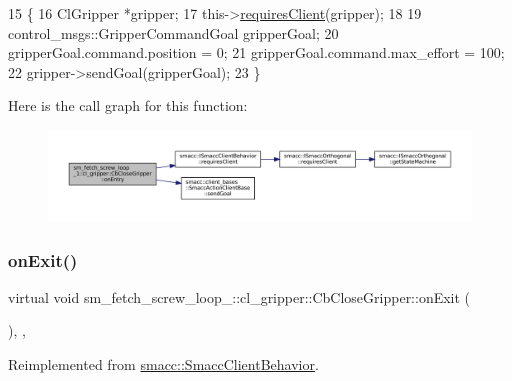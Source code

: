 \begin{DoxyCode}
15     \{
16         ClGripper *gripper;
17         this->\hyperlink{classsmacc_1_1ISmaccClientBehavior_a32b16e99e3b4cb289414203dc861a440}{requiresClient}(gripper);
18 
19         control\_msgs::GripperCommandGoal gripperGoal;
20         gripperGoal.command.position = 0;
21         gripperGoal.command.max\_effort = 100;
22         gripper->sendGoal(gripperGoal);
23     \}
\end{DoxyCode}
Here is the call graph for this function\+:
\nopagebreak
\begin{figure}[H]
\begin{center}
\leavevmode
\includegraphics[width=350pt]{classsm__fetch__screw__loop__1_1_1cl__gripper_1_1CbCloseGripper_a9a0fe49dd77571008f1cf734ec946709_cgraph}
\end{center}
\end{figure}
\mbox{\label{classsm__fetch__screw__loop__1_1_1cl__gripper_1_1CbCloseGripper_a12ed01508c835a79bad97bc2690b3642}} 
\subsubsection{\texorpdfstring{on\+Exit()}{onExit()}}
{\footnotesize\ttfamily virtual void sm\+\_\+fetch\+\_\+screw\+\_\+loop\+\_\+::cl\+\_\+gripper\+::\+Cb\+Close\+Gripper\+::on\+Exit (\begin{DoxyParamCaption}{ }\end{DoxyParamCaption})\hspace{0.3cm}{\ttfamily [inline]}, {\ttfamily [override]}, {\ttfamily [virtual]}}



Reimplemented from \hyperlink{classsmacc_1_1SmaccClientBehavior_a7e4fb6ce81ff96dc172425852d69c0c5}{smacc\+::\+Smacc\+Client\+Behavior}.



